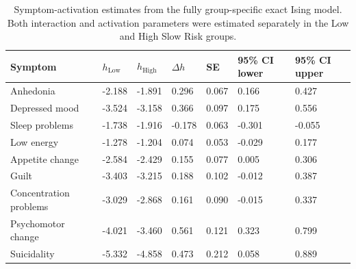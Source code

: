 \begin{table}

\caption{\label{tab:tab:appendix_activation_free}Symptom-activation estimates from the fully group-specific exact Ising model. Both interaction and activation parameters were estimated separately in the Low and High Slow Risk groups.}
\centering
\begin{tabular}[t]{lllllll}
\toprule
Symptom & $h_{\mathrm{Low}}$ & $h_{\mathrm{High}}$ & $\Delta h$ & SE & 95\% CI lower & 95\% CI upper\\
\midrule
Anhedonia & -2.188 & -1.891 & 0.296 & 0.067 & 0.166 & 0.427\\
Depressed mood & -3.524 & -3.158 & 0.366 & 0.097 & 0.175 & 0.556\\
Sleep problems & -1.738 & -1.916 & -0.178 & 0.063 & -0.301 & -0.055\\
Low energy & -1.278 & -1.204 & 0.074 & 0.053 & -0.029 & 0.177\\
Appetite change & -2.584 & -2.429 & 0.155 & 0.077 & 0.005 & 0.306\\
Guilt & -3.403 & -3.215 & 0.188 & 0.102 & -0.012 & 0.387\\
Concentration problems & -3.029 & -2.868 & 0.161 & 0.090 & -0.015 & 0.337\\
Psychomotor change & -4.021 & -3.460 & 0.561 & 0.121 & 0.323 & 0.799\\
Suicidality & -5.332 & -4.858 & 0.473 & 0.212 & 0.058 & 0.889\\
\bottomrule
\end{tabular}
\end{table}

